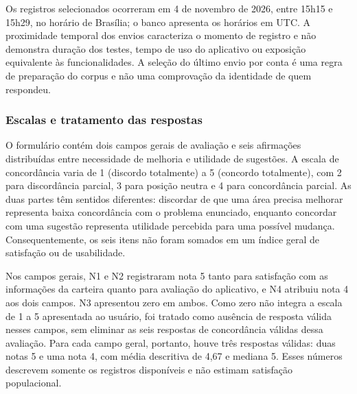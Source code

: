\documentclass{UNESC}
\begin{document}
Os registros selecionados ocorreram em 4 de novembro de 2026, entre 15h15 e 15h29, no horário de Brasília; o banco apresenta os horários em UTC. A proximidade temporal dos envios caracteriza o momento de registro e não demonstra duração dos testes, tempo de uso do aplicativo ou exposição equivalente às funcionalidades. A seleção do último envio por conta é uma regra de preparação do corpus e não uma comprovação da identidade de quem respondeu.

\subsubsection{Escalas e tratamento das respostas}

O formulário contém dois campos gerais de avaliação e seis afirmações distribuídas entre necessidade de melhoria e utilidade de sugestões. A escala de concordância varia de 1 (discordo totalmente) a 5 (concordo totalmente), com 2 para discordância parcial, 3 para posição neutra e 4 para concordância parcial. As duas partes têm sentidos diferentes: discordar de que uma área precisa melhorar representa baixa concordância com o problema enunciado, enquanto concordar com uma sugestão representa utilidade percebida para uma possível mudança. Consequentemente, os seis itens não foram somados em um índice geral de satisfação ou de usabilidade.

Nos campos gerais, N1 e N2 registraram nota 5 tanto para satisfação com as informações da carteira quanto para avaliação do aplicativo, e N4 atribuiu nota 4 aos dois campos. N3 apresentou zero em ambos. Como zero não integra a escala de 1 a 5 apresentada ao usuário, foi tratado como ausência de resposta válida nesses campos, sem eliminar as seis respostas de concordância válidas dessa avaliação. Para cada campo geral, portanto, houve três respostas válidas: duas notas 5 e uma nota 4, com média descritiva de 4,67 e mediana 5. Esses números descrevem somente os registros disponíveis e não estimam satisfação populacional.
\end{document}
